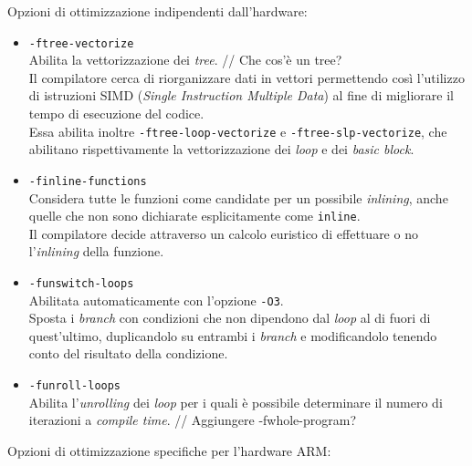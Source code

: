 Opzioni di ottimizzazione indipendenti dall'hardware:

\begin{itemize}
\item \verb|-ftree-vectorize|\\
Abilita la vettorizzazione dei \emph{tree}.
// Che cos'è un tree?\\
Il compilatore cerca di riorganizzare dati in vettori permettendo così 
l'utilizzo di istruzioni SIMD (\emph{Single Instruction Multiple Data}) al fine 
di migliorare il tempo di esecuzione del codice.\\
Essa abilita inoltre \verb|-ftree-loop-vectorize| e 
\verb|-ftree-slp-vectorize|, che abilitano rispettivamente la vettorizzazione 
dei \emph{loop} e dei \emph{basic block}.
\item \verb|-finline-functions|\\
Considera tutte le funzioni come candidate per un possibile \emph{inlining}, 
anche quelle che non sono dichiarate esplicitamente come \verb|inline|.\\
Il compilatore decide attraverso un calcolo euristico di effettuare o no 
l'\emph{inlining} della funzione. 
\item \verb|-funswitch-loops|\\
Abilitata automaticamente con l'opzione \verb|-O3|.\\
Sposta i \emph{branch} con condizioni che non dipendono dal \emph{loop} al di 
fuori di quest'ultimo, duplicandolo su entrambi i \emph{branch} e modificandolo 
tenendo conto del risultato della condizione.
\item \verb|-funroll-loops|\\
Abilita l'\emph{unrolling} dei \emph{loop} per i quali è possibile determinare 
il numero di iterazioni a \emph{compile time}.
// Aggiungere -fwhole-program?
\end{itemize}
Opzioni di ottimizzazione specifiche per l'hardware ARM:
